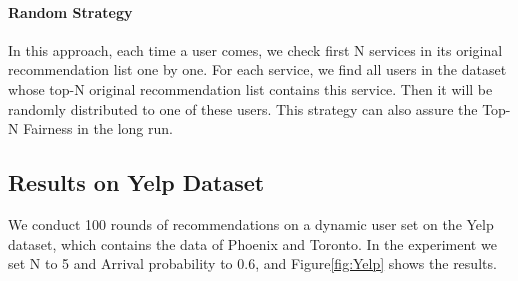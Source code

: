 \paragraph{Random Strategy} In this approach, each time a user comes, we check first N services in its original recommendation list one by one. For each service, we find all users in the dataset whose top-N original recommendation list contains this service. Then it will be randomly distributed to one of these users. This strategy can
also assure the Top-N Fairness in the long run.
\subsection{Results on Yelp Dataset}
We conduct 100 rounds of recommendations on a dynamic user set on the Yelp dataset, which contains the data of Phoenix and Toronto. In the experiment we set N to 5 and Arrival probability to 0.6, and Figure\ref{fig:Yelp} shows the results. 

